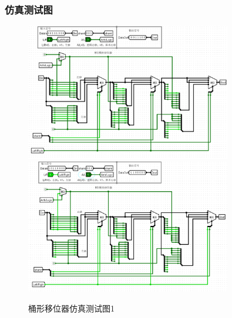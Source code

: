 \documentclass{article}
\begin{document}
    \subsubsection{仿真测试图}
    \begin{figure}[H]
    \centering
    \includegraphics[width=0.8\textwidth]{6.5.1.png}
    \includegraphics[width=0.8\textwidth]{6.5.2.png}
    \caption{桶形移位器仿真测试图1}
    \end{figure}
\end{document}
